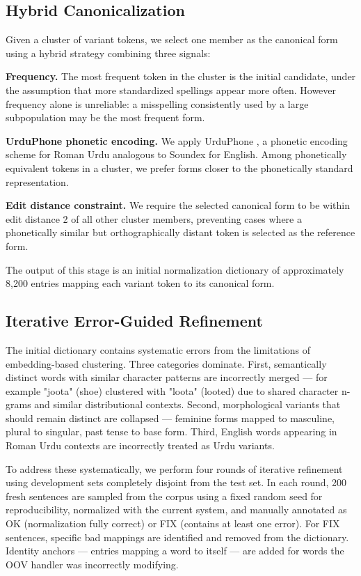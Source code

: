 \documentclass[11pt]{article}
\begin{document}
\subsection{Hybrid Canonicalization}
Given a cluster of variant tokens, we select one member as the canonical form using a hybrid strategy combining three signals:

\textbf{Frequency.} The most frequent token in the cluster is the initial candidate, under the assumption that more standardized spellings appear more often. However frequency alone is unreliable: a misspelling consistently used by a large subpopulation may be the most frequent form.

\textbf{UrduPhone phonetic encoding.} We apply UrduPhone \cite{khan2019clustering}, a phonetic encoding scheme for Roman Urdu analogous to Soundex for English. Among phonetically equivalent tokens in a cluster, we prefer forms closer to the phonetically standard representation.

\textbf{Edit distance constraint.} We require the selected canonical form to be within edit distance 2 of all other cluster members, preventing cases where a phonetically similar but orthographically distant token is selected as the reference form.

The output of this stage is an initial normalization dictionary of approximately 8,200 entries mapping each variant token to its canonical form.


\subsection{Iterative Error-Guided Refinement}
The initial dictionary contains systematic errors from the limitations of embedding-based clustering. Three categories dominate. First, semantically distinct words with similar character patterns are incorrectly merged — for example "joota" (shoe) clustered with "loota" (looted) due to shared character n-grams and similar distributional contexts. Second, morphological variants that should remain distinct are collapsed — feminine forms mapped to masculine, plural to singular, past tense to base form. Third, English words appearing in Roman Urdu contexts are incorrectly treated as Urdu variants.

To address these systematically, we perform four rounds of iterative refinement using development sets completely disjoint from the test set. In each round, 200 fresh sentences are sampled from the corpus using a fixed random seed for reproducibility, normalized with the current system, and manually annotated as OK (normalization fully correct) or FIX (contains at least one error). For FIX sentences, specific bad mappings are identified and removed from the dictionary. Identity anchors — entries mapping a word to itself — are added for words the OOV handler was incorrectly modifying.
\end{document}
